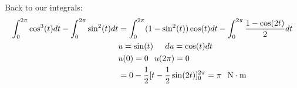 \documentclass{article}
\begin{document}
\begin{itemize}
        Back to our integrals:
        \begin{align*}
            \int_0^{2\pi} \cos^{3}(t)dt - \int_0^{2\pi} \sin^{2}(t)dt &= \int_0^{2\pi} (1-\sin^{2}(t))\cos(t)dt - \int_0^{2\pi}\frac{1-\cos(2t)}{2}dt \\
            &u = \sin(t) \hspace{0.2in} du = \cos(t)dt \\
            &u(0) = 0 \hspace{0.1in} u(2\pi) = 0\\
            &= 0 - \frac{1}{2}[t-\frac{1}{2}\sin(2t)]_0^{2\pi} = \pi \hspace{0.1in} \mathrm{N\cdot m}
        \end{align*}
    \end{itemize}

    \newpage
\end{document}
